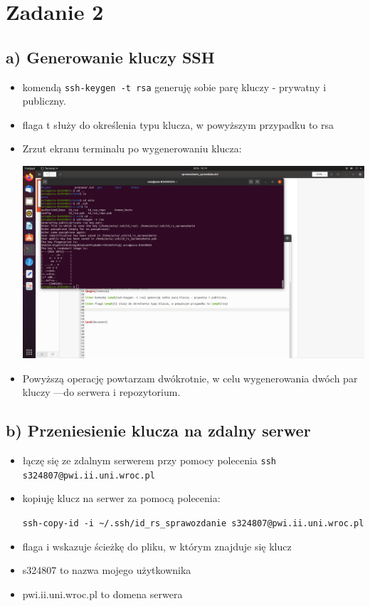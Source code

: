 \documentclass[a4paper, 11pt]{article}
\begin{document}
\section*{Zadanie 2}

\subsection*{a) Generowanie kluczy SSH}
\begin{itemize}

\item komendą \verb+ssh-keygen -t rsa+ generuję sobie parę kluczy - prywatny i publiczny.
\item flaga \textsf{t} służy do określenia typu klucza, w powyższym przypadku to \textsf{rsa}
\item Zrzut ekranu terminalu po wygenerowaniu klucza:




\noindent
\includegraphics[scale = 0.2]{screen_ssh-keygen.png}

\item Powyższą operację powtarzam dwókrotnie, w celu wygenerowania dwóch par kluczy ---do serwera i repozytorium.

\end{itemize}
\newpage
\subsection*{b) Przeniesienie klucza na zdalny serwer}
\begin{itemize}

\item łączę się ze zdalnym serwerem przy pomocy polecenia \verb+ssh s324807@pwi.ii.uni.wroc.pl+
\item kopiuję klucz na serwer za pomocą polecenia:

\verb+ssh-copy-id -i ~/.ssh/id_rs_sprawozdanie s324807@pwi.ii.uni.wroc.pl+

\item flaga \textsf{i} wskazuje ścieżkę do pliku, w którym znajduje się klucz
\item \textsf{s324807} to nazwa mojego użytkownika 
\item \textsf{pwi.ii.uni.wroc.pl} to domena serwera


\end{itemize}
\end{document}

